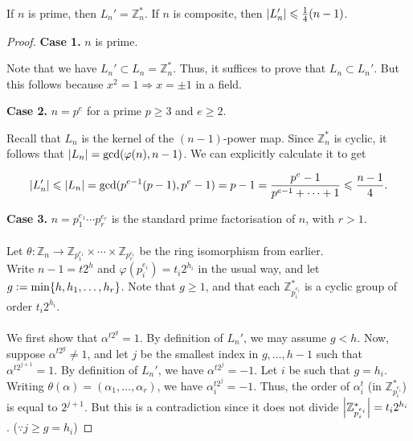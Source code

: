 \documentclass[12pt]{article}
\begin{document}
    \begin{thm}
        If $n$ is prime, then $L_{n}' = \mathbb{Z}_{n}^{\ast}$.  If $n$ is composite, then ${\left\lvert L_{n}' \right\lvert} \leqslant \frac{1}{4}(n - 1)$.
    \end{thm}
    
    \begin{proof}  %
        \textbf{Case 1.} $n$ is prime. 

        Note that we have $L_{n}' \subset L_{n} = \mathbb{Z}_{n}^{\ast}$.  Thus, it suffices to prove that $L_{n} \subset L_{n}'$.  But this follows because $x^{2} = 1 \Rightarrow x = \pm 1$ in a field. 
        
        \textbf{Case 2.} $n = p^{e}$ for a prime $p \ge 3$ and $e \ge 2$. 

        Recall that $L_{n}$ is the kernel of the $(n - 1)$-power map.  Since $\mathbb{Z}_{n}^{\ast}$ is cyclic, it follows that ${\left\lvert L_{n} \right\lvert} = \gcd(\varphi(n), n - 1)$.  We can explicitly calculate it to get 
        
        \begin{equation*} 
            {\left\lvert L_{n}' \right\lvert} \leqslant {\left\lvert L_{n} \right\lvert} = \gcd(p^{e - 1}(p - 1), p ^{e} - 1) = p - 1 = \frac{p^{e} - 1}{p^{e - 1} + \cdots + 1} \leqslant \frac{n - 1}{4}.
        \end{equation*}

        \textbf{Case 3.} $n = p_{1}^{e_{1}} \cdots p_{r}^{e_{r}}$ is the standard prime factorisation of $n$, with $r > 1$. \\~\\
        Let $\theta : \mathbb{Z}_{n} \to \mathbb{Z}_{p_{1}^{e_1}} \times \cdots \times \mathbb{Z}_{p_{r}^{e_{r}}}$ be the ring isomorphism from earlier.  \\
        Write $n - 1 = t2^{h}$ and $\varphi(p_{i}^{e_{i}}) = t_{i}2^{h_{i}}$ in the usual way,  and let $g \vcentcolon= \min\{h, h_{1}, \ldots, h_{r}\}$.  Note that $g \ge 1$, and that each $\mathbb{Z}_{p_{i}^{e_{i}}}^{\ast}$ is a cyclic group of order $t_{i}2^{h_{i}}$.  \\~\\
        We first show that $\alpha^{t2^{g}} = 1$.  By definition of $L_{n}'$, we may assume $g < h$.  Now, suppose $\alpha^{t2^{g}} \neq 1$,  and let $j$ be the smallest index in $g, \ldots, h - 1$ such that $\alpha^{t2^{j + 1}} = 1$.  By definition of $L_{n}'$, we have $\alpha^{t2^{j}} = -1$.  Let $i$ be such that $g = h_{i}$.  Writing $\theta(\alpha) = (\alpha_{1}, \ldots, \alpha_{r})$,  we have $\alpha_{i}^{t2^{j}} = -1$.  Thus, the order of $\alpha_{i}^{t}$ (in $\mathbb{Z}_{p_{i}^{e_{i}}}^{\ast}$) is equal to $2^{j + 1}$.  But this is a contradiction since it does not divide ${\left\lvert \mathbb{Z}_{p_{i}^{e_{i}}}^{\ast} \right\lvert} = t_{i}2^{h_{i}}$.  \hfill ($\because j \ge g = h_{i}$)


\end{proof}
\end{document}
